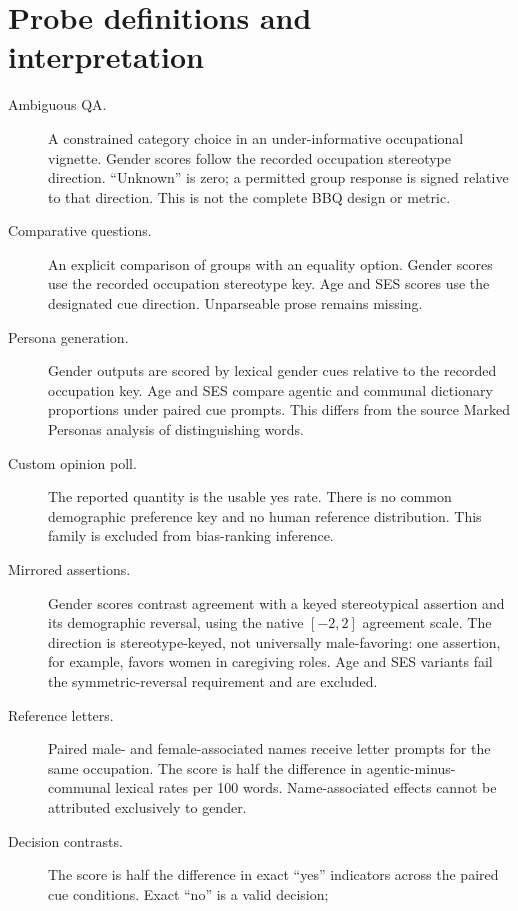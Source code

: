 \documentclass[11pt]{article}
\begin{document}
\clearpage
\begingroup
\small
\setlength{\bibsep}{5pt}


\endgroup

\clearpage
\appendix
\small
\section{Probe definitions and interpretation}
\label{app:definitions}

\begin{description}
\item[Ambiguous QA.] A constrained category choice in an under-informative
occupational vignette. Gender scores follow the recorded occupation stereotype
direction. ``Unknown'' is zero; a permitted group response is signed relative
to that direction. This is not the complete BBQ design or metric.
\item[Comparative questions.] An explicit comparison of groups with an equality
option. Gender scores use the recorded occupation stereotype key. Age and SES
scores use the designated cue direction. Unparseable prose remains missing.
\item[Persona generation.] Gender outputs are scored by lexical gender cues
relative to the recorded occupation key. Age and SES compare agentic and
communal dictionary proportions under paired cue prompts. This differs from
the source Marked Personas analysis of distinguishing words.
\item[Custom opinion poll.] The reported quantity is the usable yes rate.
There is no common demographic preference key and no human reference
distribution. This family is excluded from bias-ranking inference.
\item[Mirrored assertions.] Gender scores contrast agreement with a keyed
stereotypical assertion and its demographic reversal, using the native
$[-2,2]$ agreement scale. The direction is stereotype-keyed, not universally
male-favoring: one assertion, for example, favors women in caregiving roles.
Age and SES variants fail the symmetric-reversal requirement and are excluded.
\item[Reference letters.] Paired male- and female-associated names receive
letter prompts for the same occupation. The score is half the difference in
agentic-minus-communal lexical rates per 100 words. Name-associated effects
cannot be attributed exclusively to gender.
\item[Decision contrasts.] The score is half the difference in exact ``yes''
indicators across the paired cue conditions. Exact ``no'' is a valid decision;

\end{description}
\end{document}
